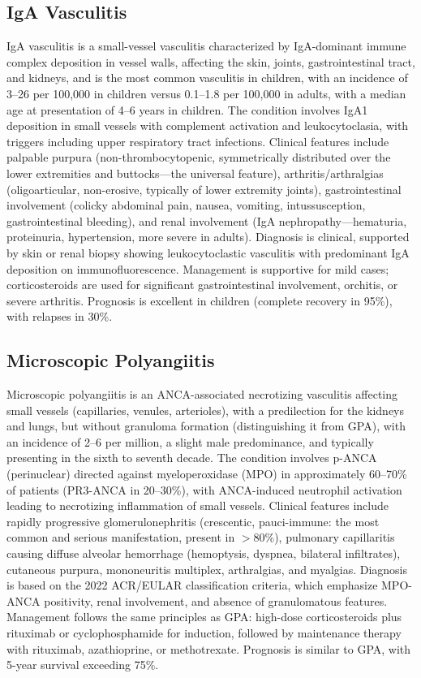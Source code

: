 \subsection{IgA Vasculitis}
\label{sec:IgA Vasculitis (Henoch-Schönlein Purpura)}
IgA vasculitis is a small-vessel vasculitis characterized by IgA-dominant immune complex deposition in vessel walls, affecting the skin, joints, gastrointestinal tract, and kidneys, and is the most common vasculitis in children, with an incidence of 3--26 per 100,000 in children versus 0.1--1.8 per 100,000 in adults, with a median age at presentation of 4--6 years in children. The condition involves IgA1 deposition in small vessels with complement activation and leukocytoclasia, with triggers including upper respiratory tract infections. Clinical features include palpable purpura (non-thrombocytopenic, symmetrically distributed over the lower extremities and buttocks---the universal feature), arthritis/arthralgias (oligoarticular, non-erosive, typically of lower extremity joints), gastrointestinal involvement (colicky abdominal pain, nausea, vomiting, intussusception, gastrointestinal bleeding), and renal involvement (IgA nephropathy---hematuria, proteinuria, hypertension, more severe in adults). Diagnosis is clinical, supported by skin or renal biopsy showing leukocytoclastic vasculitis with predominant IgA deposition on immunofluorescence. Management is supportive for mild cases; corticosteroids are used for significant gastrointestinal involvement, orchitis, or severe arthritis. Prognosis is excellent in children (complete recovery in 95\%), with relapses in 30\%.

\subsection{Microscopic Polyangiitis}
\label{sec:Microscopic Polyangiitis (MPA)}
Microscopic polyangiitis is an ANCA-associated necrotizing vasculitis affecting small vessels (capillaries, venules, arterioles), with a predilection for the kidneys and lungs, but without granuloma formation (distinguishing it from GPA), with an incidence of 2--6 per million, a slight male predominance, and typically presenting in the sixth to seventh decade. The condition involves p-ANCA (perinuclear) directed against myeloperoxidase (MPO) in approximately 60--70\% of patients (PR3-ANCA in 20--30\%), with ANCA-induced neutrophil activation leading to necrotizing inflammation of small vessels. Clinical features include rapidly progressive glomerulonephritis (crescentic, pauci-immune: the most common and serious manifestation, present in $>$80\%), pulmonary capillaritis causing diffuse alveolar hemorrhage (hemoptysis, dyspnea, bilateral infiltrates), cutaneous purpura, mononeuritis multiplex, arthralgias, and myalgias. Diagnosis is based on the 2022 ACR/EULAR classification criteria, which emphasize MPO-ANCA positivity, renal involvement, and absence of granulomatous features. Management follows the same principles as GPA: high-dose corticosteroids plus rituximab or cyclophosphamide for induction, followed by maintenance therapy with rituximab, azathioprine, or methotrexate. Prognosis is similar to GPA, with 5-year survival exceeding 75\%.

